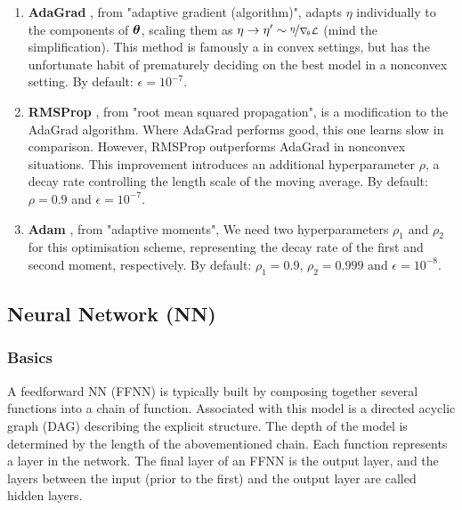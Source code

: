     \begin{enumerate}[leftmargin=0pt,labelwidth=!,labelsep=.05em]
        \item[]\textbf{AdaGrad} \citep[algorithm 8.4]{Goodfellow2016}, from "adaptive gradient (algorithm)", adapts $\eta$ individually to the components of $\boldsymbol{\theta}$, scaling them as $\eta \to \eta' \sim \nicefrac{\eta}{\nabla_{\! \theta} \mathcal{L}}$ (mind the simplification). This method is famously a  in convex settings, but has the unfortunate habit of prematurely deciding on the best model in a nonconvex setting. By default: $\epsilon=10^{-7}$.
        \item[]\textbf{RMSProp} \citep[algorithm 8.5]{Goodfellow2016}, from "root mean squared propagation", is a modification to the AdaGrad algorithm. Where AdaGrad performs good, this one learns slow in comparison. However, RMSProp outperforms AdaGrad in nonconvex situations. This improvement introduces an additional hyperparameter $\rho$, a decay rate controlling the length scale of the moving average. By default: $\rho = 0.9$ and $\epsilon=10^{-7}$.
        \item[]\textbf{Adam} \citep[algorithm 8.7]{Goodfellow2016}, from "adaptive moments", \fillertext We need two hyperparameters $\rho_1$ and $\rho_2$ for this optimisation scheme, representing the decay rate of the first and second moment, respectively. By default: $\rho_1 = 0.9$, $\rho_2=0.999$ and $\epsilon=10^{-8}$.
    \end{enumerate}

    
    
\subsection{Neural Network (NN)}\label{sec:neural_network}

    \subsubsection{Basics}\label{sec:basics}

    A feedforward NN (FFNN) is typically built by composing together several functions into a chain of function. Associated with this model is a directed acyclic graph (DAG) describing the explicit structure. The depth of the model is determined by the length of the abovementioned chain. Each function represents a layer in the network. The final layer of an FFNN is the output layer, and the layers between the input (prior to the first) and the output layer are called hidden layers. \citep{Goodfellow2016}

